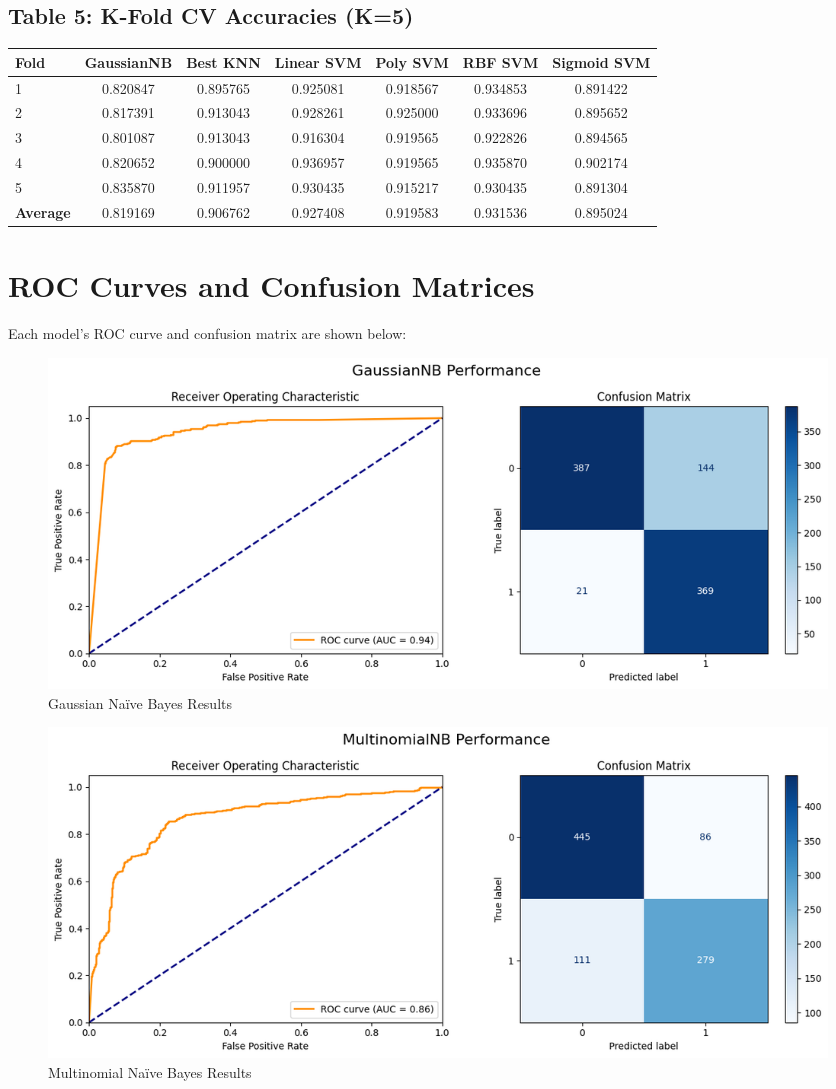 \documentclass[12pt]{article}
\begin{document}
\subsection*{Table 5: K-Fold CV Accuracies (K=5)}
\begin{tabular}{|l|c|c|c|c|c|c|}
\hline
\textbf{Fold} & \textbf{GaussianNB} & \textbf{Best KNN} & \textbf{Linear SVM} & \textbf{Poly SVM} & \textbf{RBF SVM} & \textbf{Sigmoid SVM} \\
\hline
1 & 0.820847 & 0.895765 & 0.925081 & 0.918567 & 0.934853 & 0.891422 \\
2 & 0.817391 & 0.913043 & 0.928261 & 0.925000 & 0.933696 & 0.895652 \\
3 & 0.801087 & 0.913043 & 0.916304 & 0.919565 & 0.922826 & 0.894565 \\
4 & 0.820652 & 0.900000 & 0.936957 & 0.919565 & 0.935870 & 0.902174 \\
5 & 0.835870 & 0.911957 & 0.930435 & 0.915217 & 0.930435 & 0.891304 \\
\hline
\textbf{Average} & 0.819169 & 0.906762 & 0.927408 & 0.919583 & 0.931536 & 0.895024 \\
\hline
\end{tabular}

\section*{ROC Curves and Confusion Matrices}
Each model’s ROC curve and confusion matrix are shown below:

\begin{figure}[H]
\centering
\includegraphics[width=1\textwidth]{images/naivebayes1.png}
\caption{Gaussian Na\"ive Bayes Results}
\end{figure}

\begin{figure}[H]
\centering
\includegraphics[width=1\textwidth]{images/naivebayes2.png}
\caption{Multinomial Na\"ive Bayes Results}
\end{figure}
\end{document}
